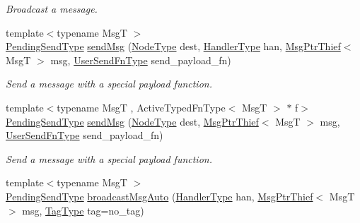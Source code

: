 \begin{DoxyCompactItemize}
\begin{DoxyCompactList}\small\item\em Broadcast a message. \end{DoxyCompactList}\item 
{\footnotesize template$<$typename MsgT $>$ }\\\hyperlink{structvt_1_1messaging_1_1_active_messenger_a3626a6ca76d8ad4ec7c3b47a2c70d3a8}{Pending\+Send\+Type} \hyperlink{group__sendpayload_ga3548fb78b56bcd3f06cdb2fc6239e3c6}{send\+Msg} (\hyperlink{namespacevt_a866da9d0efc19c0a1ce79e9e492f47e2}{Node\+Type} dest, \hyperlink{namespacevt_af64846b57dfcaf104da3ef6967917573}{Handler\+Type} han, \hyperlink{structvt_1_1messaging_1_1_msg_ptr_thief}{Msg\+Ptr\+Thief}$<$ MsgT $>$ msg, \hyperlink{structvt_1_1messaging_1_1_active_messenger_a4b1993ad77436b6ed6c7fd32801c50ed}{User\+Send\+Fn\+Type} send\+\_\+payload\+\_\+fn)
\begin{DoxyCompactList}\small\item\em Send a message with a special payload function. \end{DoxyCompactList}\item 
{\footnotesize template$<$typename MsgT , Active\+Typed\+Fn\+Type$<$ Msg\+T $>$ $\ast$ f$>$ }\\\hyperlink{structvt_1_1messaging_1_1_active_messenger_a3626a6ca76d8ad4ec7c3b47a2c70d3a8}{Pending\+Send\+Type} \hyperlink{group__sendpayload_ga11c4c7dec9f0da88060bacff76fb118d}{send\+Msg} (\hyperlink{namespacevt_a866da9d0efc19c0a1ce79e9e492f47e2}{Node\+Type} dest, \hyperlink{structvt_1_1messaging_1_1_msg_ptr_thief}{Msg\+Ptr\+Thief}$<$ MsgT $>$ msg, \hyperlink{structvt_1_1messaging_1_1_active_messenger_a4b1993ad77436b6ed6c7fd32801c50ed}{User\+Send\+Fn\+Type} send\+\_\+payload\+\_\+fn)
\begin{DoxyCompactList}\small\item\em Send a message with a special payload function. \end{DoxyCompactList}\item 
{\footnotesize template$<$typename MsgT $>$ }\\\hyperlink{structvt_1_1messaging_1_1_active_messenger_a3626a6ca76d8ad4ec7c3b47a2c70d3a8}{Pending\+Send\+Type} \hyperlink{group__sendpayload_gab11ebaa792d7b87397773347626ad4f9}{broadcast\+Msg\+Auto} (\hyperlink{namespacevt_af64846b57dfcaf104da3ef6967917573}{Handler\+Type} han, \hyperlink{structvt_1_1messaging_1_1_msg_ptr_thief}{Msg\+Ptr\+Thief}$<$ MsgT $>$ msg, \hyperlink{namespacevt_a84ab281dae04a52a4b243d6bf62d0e52}{Tag\+Type} tag=no\+\_\+tag)

\end{DoxyCompactItemize}

